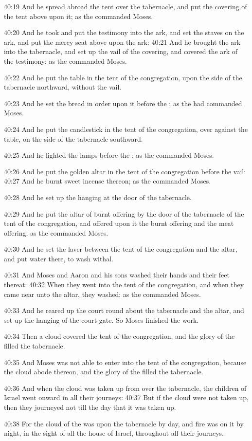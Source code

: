 40:19 And he spread abroad the tent over the tabernacle, and put the
covering of the tent above upon it; as the \LORD commanded Moses.

40:20 And he took and put the testimony into the ark, and set the
staves on the ark, and put the mercy seat above upon the ark: 40:21
And he brought the ark into the tabernacle, and set up the vail of the
covering, and covered the ark of the testimony; as the \LORD commanded
Moses.

40:22 And he put the table in the tent of the congregation, upon the
side of the tabernacle northward, without the vail.

40:23 And he set the bread in order upon it before the \LORD; as the
\LORD had commanded Moses.

40:24 And he put the candlestick in the tent of the congregation, over
against the table, on the side of the tabernacle southward.

40:25 And he lighted the lamps before the \LORD; as the \LORD commanded
Moses.

40:26 And he put the golden altar in the tent of the congregation
before the vail: 40:27 And he burnt sweet incense thereon; as the \LORD
commanded Moses.

40:28 And he set up the hanging at the door of the tabernacle.

40:29 And he put the altar of burnt offering by the door of the
tabernacle of the tent of the congregation, and offered upon it the
burnt offering and the meat offering; as the \LORD commanded Moses.

40:30 And he set the laver between the tent of the congregation and
the altar, and put water there, to wash withal.

40:31 And Moses and Aaron and his sons washed their hands and their
feet thereat: 40:32 When they went into the tent of the congregation,
and when they came near unto the altar, they washed; as the \LORD
commanded Moses.

40:33 And he reared up the court round about the tabernacle and the
altar, and set up the hanging of the court gate. So Moses finished the
work.

40:34 Then a cloud covered the tent of the congregation, and the glory
of the \LORD filled the tabernacle.

40:35 And Moses was not able to enter into the tent of the
congregation, because the cloud abode thereon, and the glory of the
\LORD filled the tabernacle.

40:36 And when the cloud was taken up from over the tabernacle, the
children of Israel went onward in all their journeys: 40:37 But if the
cloud were not taken up, then they journeyed not till the day that it
was taken up.

40:38 For the cloud of the \LORD was upon the tabernacle by day, and
fire was on it by night, in the sight of all the house of Israel,
throughout all their journeys.

